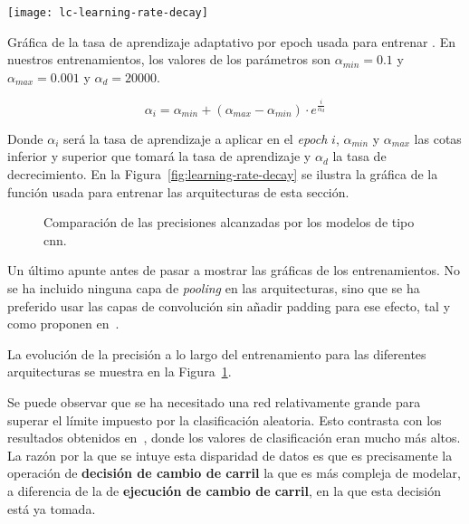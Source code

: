 \begin{marginfigure}
	\centering
	\texttt{[image: lc-learning-rate-decay]}
	\caption[Gráfica de la tasa de aprendizaje adaptativo por \textit{epoch} usada para entrenar ]{Gráfica de la tasa de aprendizaje adaptativo por epoch usada para entrenar . En nuestros entrenamientos, los valores de los parámetros son $\alpha_{min} = 0.1$ y $\alpha_{max} = 0.001$ y $\alpha_d = 20000$.}
	\label{fig:learning-rate-decay}
\end{marginfigure}

\begin{equation}
    \alpha_i = \alpha_{min} + (\alpha_{max} - \alpha_{min}) \cdot e^\frac{i}{\alpha_d}
	\label{eq:learning-rate-decay}
\end{equation}

Donde $\alpha_i$ será la tasa de aprendizaje a aplicar en el \textit{epoch} $i$, $\alpha_{min}$ y $\alpha_{max}$ las cotas inferior y superior que tomará la tasa de aprendizaje y $\alpha_d$ la tasa de decrecimiento. En la Figura~\ref{fig:learning-rate-decay} se ilustra la gráfica de la función usada para entrenar las arquitecturas de esta sección.

\begin{figure}[b]
	\centering
	\qquad
	\caption[Comparación de las precisiones alcanzadas por los modelos de tipo ]{Comparación de las precisiones alcanzadas por los modelos de tipo \acrshort{cnn}.}
	\label{fig:lc-cnn-training-validation-test-comparison}
\end{figure}


Un último apunte antes de pasar a mostrar las gráficas de los entrenamientos. No se ha incluido ninguna capa de \textit{pooling} en las arquitecturas, sino que se ha preferido usar las capas de convolución sin añadir padding para ese efecto, tal y como proponen en~\cite{howard2017mobilenets}.

La evolución de la precisión a lo largo del entrenamiento para las diferentes arquitecturas se muestra en la Figura~\ref{fig:lc-cnn-training-validation-test-comparison}.

Se puede observar que se ha necesitado una red relativamente grande para superar el límite impuesto por la clasificación aleatoria. Esto contrasta con los resultados obtenidos en~\cite{diaz2018modelling}, donde los valores de clasificación eran mucho más altos. La razón por la que se intuye esta disparidad de datos es que es precisamente la operación de \textbf{decisión de cambio de carril} la que es más compleja de modelar, a diferencia de la de \textbf{ejecución de cambio de carril}, en la que esta decisión está ya tomada.

